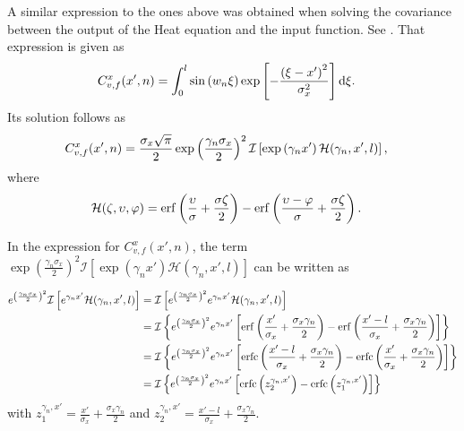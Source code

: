 \documentclass[a4paper,10pt]{article}
\newcommand{\dif}{\textrm{d}}
\DeclareMathOperator{\erf}{erf}
\DeclareMathOperator{\erfc}{erfc}
\begin{document}
A similar expression to the ones above was obtained when solving the
covariance between the output of the Heat equation and the input
function. See \cite{Alvarez:HeatEquationReport}. That expression is
given as
\begin{align}
C^x_{v,f}(x',n)&=\int_0^l\sin\left(w_n\xi\right)
\exp\left[-\frac{\left(\xi-x'\right)^2}{\sigma^2_x}\right]\dif\xi.\notag
\end{align}
Its solution follows as
\begin{align}
C^x_{v,f}(x',n)&=\frac{\sigma_x\sqrt{\pi}}{2}\exp\left(\frac{\gamma_n\sigma_x}{2}\right)^2\mathcal{I}\left[\exp\left(\gamma_nx'\right)\mathcal{H}(\gamma_n,x',l)\right],\notag
\end{align}
where
\begin{align}
\notag \mathcal{H}(\zeta,\upsilon,\varphi)&=\erf\left(\frac{\upsilon}{\sigma}+\frac{\sigma \zeta}{2}\right)-\erf\left(\frac{\upsilon-\varphi}{\sigma}+\frac{\sigma \zeta}{2}\right).
\end{align}

In the expression for $C^x_{v,f}(x',n)$, the term
$\exp\left(\frac{\gamma_n\sigma_x}{2}\right)^2\mathcal{I}\left[\exp\left(\gamma_nx'\right)\mathcal{H}(\gamma_n,x',l)\right]$
can be written as

\begin{align}\notag
e^{\left(\frac{\gamma_n\sigma_x}{2}\right)^2}\mathcal{I}\left[e^{\gamma_nx'}\mathcal{H}(\gamma_n,x',l)\right]& = \mathcal{I}\left[e^{\left(\frac{\gamma_n\sigma_x}{2}\right)^2}e^{\gamma_nx'}\mathcal{H}(\gamma_n,x',l)\right] \\
%
\notag
&= \mathcal{I}\left\{e^{\left(\frac{\gamma_n\sigma_x}{2}\right)^2}e^{\gamma_nx'}\left[\erf\left(\frac{x'}{\sigma_x}+\frac{\sigma_x \gamma_n}{2}\right)-\erf\left(\frac{x'-l}{\sigma_x}+\frac{\sigma_x \gamma_n}{2}\right)\right]\right\}\\
%
\notag
&=
  \mathcal{I}\left\{e^{\left(\frac{\gamma_n\sigma_x}{2}\right)^2}e^{\gamma_nx'}\left[\erfc\left(\frac{x'-l}{\sigma_x}+\frac{\sigma_x
  \gamma_n}{2}\right)-\erfc\left(\frac{x'}{\sigma_x}+\frac{\sigma_x
  \gamma_n}{2}\right)\right]\right\}\\
& = \mathcal{I}\left\{e^{\left(\frac{\gamma_n\sigma_x}{2}\right)^2}e^{\gamma_nx'}\left[\erfc\left(z_2^{\gamma_n,x'}\right)-\erfc\left(z_1^{\gamma_n,x'}\right)\right]\right\}
\end{align}
with $z_1^{\gamma_n,x'}=\frac{x'}{\sigma_x}+\frac{\sigma_x \gamma_n}{2}$ and $z_2^{\gamma_n,x'}=\frac{x'-l}{\sigma_x}
+\frac{\sigma_x\gamma_n}{2}$.\\
\end{document}
